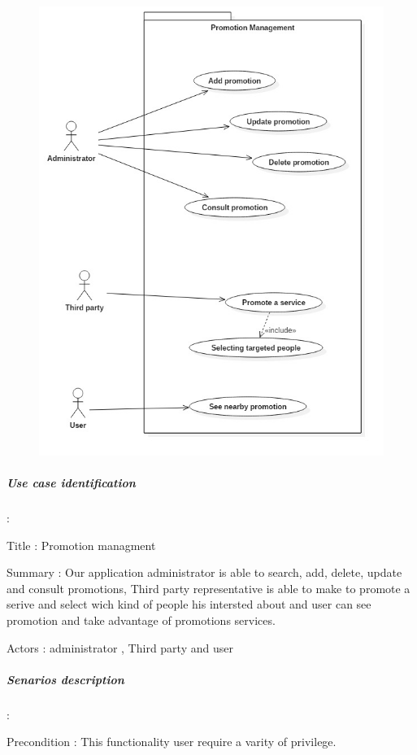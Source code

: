  \begin{figure}[H]
	\centering
	\includegraphics[height=0.4\textheight]{fig01/PromotionUseCaseDiagram}
	\label{fig:FilialesEtClients}
\end{figure}

\subparagraph{Use case identification} :
\label{sec:sec01} 

Title : Promotion managment

Summary : Our application administrator is able to search, add, delete, update and consult promotions,
Third party representative is able to make to promote a serive and select wich kind of people his intersted about and
user can see promotion and take advantage of promotions services.

Actors : administrator , Third party and user

\subparagraph{Senarios description} :
\label{sec:sec01}

Precondition : This functionality user require a varity of privilege.

